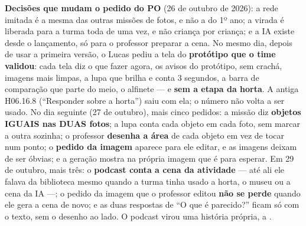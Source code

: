 \textbf{Decisões que mudam o pedido do PO} (26 de outubro de 2026): a rede
imitada é a mesma das outras missões de fotos, e não a do 1º ano; a virada é
liberada para a turma toda de uma vez, e não criança por criança; e a IA
existe desde o lançamento, só para o professor preparar a cena. No mesmo dia,
depois de usar a primeira versão, o Lucas pediu a tela do \textbf{protótipo
que o time validou}: cada tela diz o que fazer agora, os avisos do protótipo,
sem crachá, imagens mais limpas, a lupa que brilha e conta 3 segundos, a
barra de comparação que parte do meio, o alfinete --- e \textbf{sem a etapa
da horta}. A antiga H06.16.8 (\enquote{Responder sobre a horta}) saiu com
ela; o número não volta a ser usado. No dia seguinte (27 de outubro), mais
cinco pedidos: a missão diz \textbf{objetos IGUAIS nas DUAS fotos}; a lupa
conta cada objeto em cada foto, sem marcar a outra sozinha; o professor
\textbf{desenha a área} de cada objeto em vez de tocar num ponto; o
\textbf{pedido da imagem} aparece para ele editar, e as imagens deixam de
ser óbvias; e a geração mostra na própria imagem que é para esperar. Em 29 de outubro,
mais três: o \textbf{podcast conta a cena da atividade} --- até ali ele
falava da biblioteca mesmo quando a turma tinha usado a horta, o museu ou a
cena da IA ---; o pedido da imagem que o professor editou \textbf{não se
perde} quando ele gera a cena de novo; e as duas respostas de \enquote{O que
é parecido?} ficam só com o texto, sem o desenho ao lado. O podcast virou
uma história própria, a .

